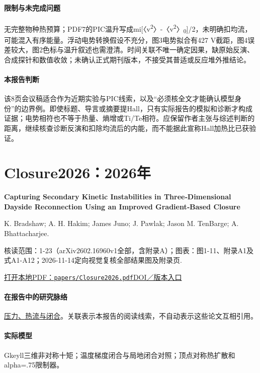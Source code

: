 \paragraph{限制与未完成问题}无完整物种热预算；PDF7的PIC温升写成mi[〈v\textsuperscript{2}〉-〈v\textsuperscript{2}〉\textsubscript{0}]/2，未明确扣均流，可能混入有序能量。浮动电势转换假设不充分，图3电势拟合有427 V截距，图4误差较大，图2色标与温升叙述也需澄清。时间关联不唯一确定因果，缺原始反演、合成探针和数值收敛；未确认正式期刊版本，不接受其普适或反应堆外推结论。

\paragraph{本报告判断}该8页会议稿适合作为近期实验与PIC线索，以及“必须核全文才能确认模型身份”的边界例。即使标题、导言或摘要提Hall，只有实际报告的模拟和诊断才构成证据；电势相符也不等于热量、熵增或Ti/Te相符。应保留作者主张与综述判断的距离，继续核查诊断反演和扣除均流后的内能，而不能据此宣称Hall加热比已获验证。

\section{Closure2026：2026年}\label{paper:Closure2026}

\textbf{Capturing Secondary Kinetic Instabilities in Three‐Dimensional Dayside Reconnection Using an Improved Gradient‐Based Closure}\citep{Closure2026}\

K. Bradshaw;  A. H. Hakim;  James Juno;  J. Pawlak;  Jason M. TenBarge;  A. Bhattacharjee.

\textsf{核读范围：}1-23（arXiv2602.16960v1全部，含附录A）；\textsf{图表：}图1-11、附录A1及式A1-A12；2026-11-14定向视觉复核全部结果图及附录页.

\href{run:papers/Closure2026.pdf}{打开本地PDF：\texttt{papers/Closure2026.pdf}}\quad\href{https://doi.org/10.1029/2026ja035250}{DOI／版本入口}

\paragraph{在报告中的研究脉络}\hyperref[story:closure]{压力、热流与闭合}。关联表示本报告的阅读线索，不自动表示这些论文互相引用。

\paragraph{实际模型}Gkeyll三维非对称十矩；温度梯度闭合与局地闭合对照；顶点对称热扩散和alpha=.75限制器。

